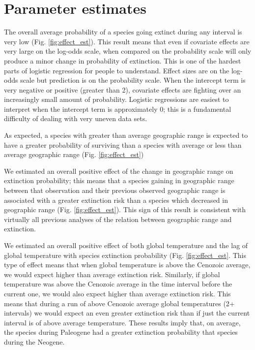 \documentclass[12pt,letterpaper]{article}
\begin{document}
\section{Parameter estimates}

The overall average probability of a species going extinct during any interval is very low (Fig. \ref{fig:effect_est}). This result means that even if covariate effects are very large on the log-odds scale, when compared on the probability scale will only produce a minor change in probability of extinction. This is one of the hardest parts of logistic regression for people to understand. Effect sizes are on the log-odds scale but prediction is on the probability scale. When the intercept term is very negative or positive (greater than 2), covariate effects are fighting over an increasingly small amount of probability. Logistic regressions are easiest to interpret when the intercept term is approximately 0; this is a fundamental difficulty of dealing with very uneven data sets.

As expected, a species with greater than average geographic range is expected to have a greater probability of surviving than a species with average or less than average geographic range (Fig. \ref{fig:effect_est})

We estimated an overall positive effect of the change in geographic range on extinction probability; this means that a species gaining in geographic range between that observation and their previous observed geographic range is associated with a greater extinction risk than a species which decreased in geographic range (Fig. \ref{fig:effect_est}). This sign of this result is consistent with virtually all previous analyses of the relation between geographic range and extinction.

We estimated an overall positive effect of both global temperature and the lag of global temperature with species extinction probability (Fig. \ref{fig:effect_est}. This type of effect means that when global temperature is above the Cenozoic average, we would expect higher than average extinction risk. Similarly, if global temperature was above the Cenozoic average in the time interval before the current one, we would also expect higher than average extinction risk. This means that during a run of above Cenozoic average global temperatures (2+ intervals) we would expect an even greater extinction risk than if just the current interval is of above average temperature. These results imply that, on average, the species during Paleogene had a greater extinction probability that species during the Neogene.
\end{document}
